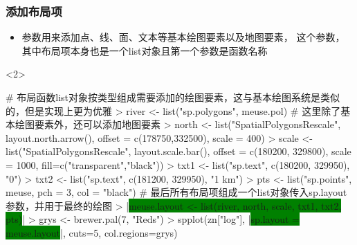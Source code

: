 \subsubsection{添加布局项}
\begin{frame}[t,fragile]{\subsecname}{\subsubsecname}
\begin{itemize} 
\item<1-> 参数用来添加点、线、面、文本等基本绘图要素以及地图要素，
这个参数，其中布局项本身也是一个list对象且第一个参数是函数名称
\end{itemize}

\begin{overlayarea}{\textwidth}{\textheight}

\begin{onlyenv}<2>
\begin{rcode}
# 布局函数list对象按类型组成需要添加的绘图要素，这与基本绘图系统是类似的，但是实现上更为优雅
> river <- list("sp.polygons", meuse.pol)
# 这里除了基本绘图要素外，还可以添加地图要素
> north <- list("SpatialPolygonsRescale", layout.north.arrow(), offset = c(178750,332500), scale = 400)
> scale <- list("SpatialPolygonsRescale", layout.scale.bar(), offset = c(180200, 329800), scale = 1000, fill=c("transparent","black"))
> txt1 <- list("sp.text", c(180200, 329950), "0")
> txt2 <- list("sp.text", c(181200, 329950), "1 km")
> pts <- list("sp.points", meuse, pch = 3, col = "black")
# 最后所有布局项组成一个list对象传入sp.layout参数，并用于最终的绘图
> |\colorbox{green}{meuse.layout <- list(river, north, scale, txt1, txt2, pts)}|
> grys <- brewer.pal(7, "Reds")
> spplot(zn["log"], |\colorbox{green}{sp.layout = meuse.layout}|, cuts=5, col.regions=grys)
\end{rcode}
\end{onlyenv}


\end{overlayarea}
\end{frame}
